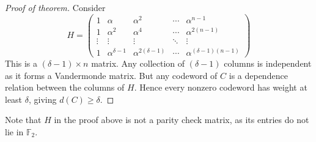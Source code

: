 \begin{proof}[Proof of theorem]
    Consider
    \[ H = \begin{pmatrix}
        1 & \alpha & \alpha^2 & \cdots & \alpha^{n-1} \\
        1 & \alpha^2 & \alpha^4 & \cdots & \alpha^{2(n-1)} \\
        \vdots & \vdots & \vdots & \ddots & \vdots \\
        1 & \alpha^{\delta - 1} & \alpha^{2(\delta - 1)} & \cdots & \alpha^{(\delta - 1)(n-1)}
    \end{pmatrix} \]
    This is a \( (\delta - 1) \times n \) matrix.
    Any collection of \( (\delta - 1) \) columns is independent as it forms a Vandermonde matrix.
    But any codeword of \( C \) is a dependence relation between the columns of \( H \).
    Hence every nonzero codeword has weight at least \( \delta \), giving \( d(C) \geq \delta \).
\end{proof}
Note that \( H \) in the proof above is not a parity check matrix, as its entries do not lie in \( \mathbb F_2 \).

